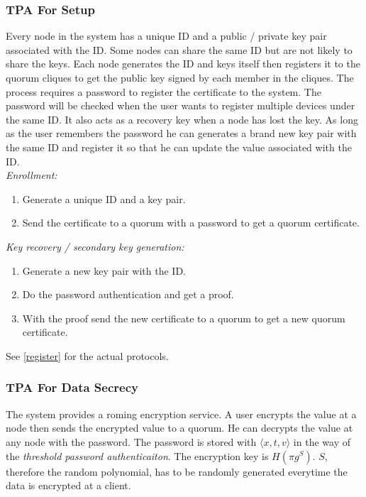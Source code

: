\documentclass[twoside,twocolumn,10pt,fleqn]{article}
\begin{document}
\subsubsection*{TPA For Setup}
Every node in the system has a unique ID and a public / private key
pair associated with the ID. Some nodes can share the same ID but are
not likely to share the keys. Each node generates the ID and keys
itself then registers it to the quorum cliques to get the public key
signed by each member in the cliques. The process requires a password
to register the certificate to the system. The password will be checked
when the user wants to register multiple devices under the
same ID. It also acts as a recovery key when a node has lost the
key. As long as the user remembers the password he can generates a
brand new key pair with the same ID and register it so that he can
update the value associated with the ID.\\

\noindent
{\em Enrollment:}
\begin{enumerate}
\item Generate a unique ID and a key pair.
\item Send the certificate to a quorum with a password to get a
  quorum certificate.
\end{enumerate}

\noindent
{\em Key recovery / secondary key generation:}
\begin{enumerate}
\item Generate a new key pair with the ID.
\item Do the password authentication and get a proof.
\item With the proof send the new certificate to a quorum to get a new
  quorum certificate.
\end{enumerate}
See \ref{register} for the actual protocols.

\subsubsection*{TPA For Data Secrecy}
The system provides a roming encryption service. A user encrypts
the value at a node then sends the encrypted value to a quorum. He can
decrypts the value at any node with the password. The password is
stored with $\langle x, t, v \rangle$ in the way of the {\em threshold
password authenticaiton}. The encryption key is $H(\pi g^S)$. $S$,
therefore the random polynomial, has to be randomly generated
everytime the data is encrypted at a client.
\end{document}
